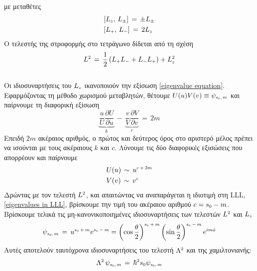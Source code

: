 με μεταθέτες
\begin{equation}
\begin{split}
    &[L\subscr{z},\,L\subscr{\pm}]\,=\,\pm L\subscr{\pm}\\
    &[L\subscr{+},\,L\subscr{-}]\,=\,2L\subscr{z}
\end{split}
\end{equation}
Ο τελεστής της στροφορμής στο τετράγωνο δίδεται από τη σχέση
\begin{equation}\label{casimir invariant}
    L\superscr{2}\,=\,\frac{1}{2}\left( L\subscr{+}L\subscr{-}+L\subscr{-}L\subscr{+} \right) + L\subscr{z}\superscr{2}
\end{equation}
\\

Οι ιδιοσυναρτήσεις του $L\subscr{z}$
ικανοποιούν την εξίσωση \eqref{eigenvalue equation}. Εφαρμόζοντας τη μέθοδο χωρισμού μεταβλητών, θέτουμε $U(u)V(v)\equiv\psi\subscr{s\subscr{0},m}$ και παίρνουμε τη διαφορική εξίσωση
\begin{equation*}
    \underbrace{\frac{u}{U}\frac{\partial U}{\partial u}}_{k}\,-\,\underbrace{\frac{v}{V}\frac{\partial V}{\partial v}}_{c} \,=\, 2m
\end{equation*}
Επειδή $2m$ 
ακέραιος αριθμός, ο πρώτος και δεύτερος όρος στο αριστερό μέλος πρέπει να ισούνται με τους ακέραιους $k$ και $c$. Λύνουμε τις δύο διαφορικές εξισώσεις που απορρέουν και παίρνουμε
\begin{equation*}
    \begin{split}
        &U(u)\,\sim\,u\superscr{c+2m}\\
        &V(v)\,\sim\,v\superscr{c}
    \end{split}
\end{equation*}
Δρώντας με τον τελεστή $L\superscr{2}$, και απαιτώντας να αναπαράγεται η ιδιοτιμή στη LLL, \eqref{eigenvalues in LLL}, βρίσκουμε την τιμή του ακέραιου αριθμού $c=s\subscr{0}-m$. Βρίσκουμε τελικά τις μη-κανονικοποιημένες ιδιοσυναρτήσεις των τελεστών $L\superscr{2}$ και $L\subscr{z}$
\begin{equation}\label{monomial eigenfunction}
        \psi\subscr{s\subscr{0},m}\,=\,u\superscr{s\subscr{0}+m}v\superscr{s\subscr{0}-m}=\left(\cos\frac{\theta}{2}\right)\superscr{s\subscr{0}+m}\left(\sin\frac{\theta}{2}\right)\superscr{s\subscr{0}-m}e\superscr{im\phi}
\end{equation}
Αυτές αποτελούν ταυτόχρονα ιδιοσυναρτήσεις του τελεστή $\Lambda\superscr{2}$ και της χαμιλτονιανής:
\begin{equation}
    \Lambda\superscr{2}\,\psi\subscr{s\subscr{0},m}\,=\,\hbar\superscr{2}s\subscr{0}\psi\subscr{s\subscr{0},m}
\end{equation}
\\

